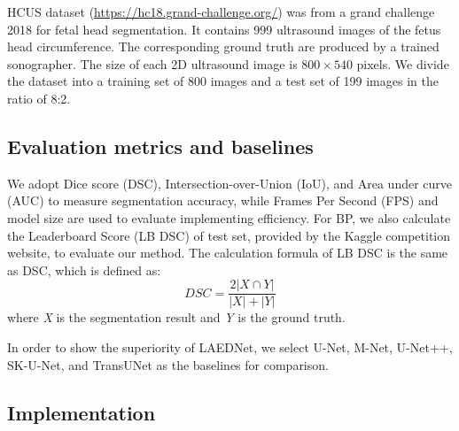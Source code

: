 \documentclass[review]{elsarticle}
\begin{document}
HCUS \cite{2018Automated} dataset (\url{https://hc18.grand-challenge.org/}) was from a grand challenge 2018 for fetal head segmentation. It contains 999 ultrasound images of the fetus head circumference. The corresponding ground truth are produced by a trained sonographer. The size of each 2D ultrasound image is $800\times540$ pixels. We divide the dataset into a training set of 800 images and a test set of 199 images in the ratio of 8:2.

\subsection{Evaluation metrics and baselines}

We adopt Dice score (DSC), Intersection-over-Union (IoU), and Area under curve (AUC) to measure segmentation accuracy, while Frames Per Second (FPS) and model size are used to evaluate implementing efficiency. For BP\cite{Kaggle}, we also calculate the Leaderboard Score (LB DSC)\cite{Kaggle} of test set, provided by the Kaggle competition website, to evaluate our method. The calculation formula of LB DSC is the same as DSC, which is defined as:
\begin{equation}
	DSC=\frac{2\left | X\cap Y \right |}{\left | X \right |+\left | Y \right |}
\end{equation}
where \emph{X} is the segmentation result and \emph{Y} is the ground truth. 

In order to show the superiority of LAEDNet, we select U-Net\cite{2015U}, M-Net\cite{2019Deep}, U-Net++\cite{2020UNet}, SK-U-Net\cite{2020breastmass}, and TransUNet\cite{chen2021transunet} as the baselines for comparison.

\subsection{Implementation}
\end{document}

